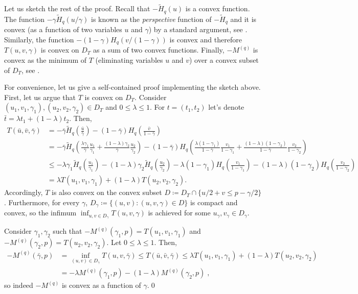 \documentclass{article}
\newcommand{\Htilde}{\tilde{H}}
\theoremstyle{plain}
\theoremstyle{plain}
\theoremstyle{plain}
\theoremstyle{plain}
\theoremstyle{plain}
\theoremstyle{plain}
\theoremstyle{plain}
\theoremstyle{plain}
\theoremstyle{plain}
\theoremstyle{plain}
\theoremstyle{remark}
\theoremstyle{remark}
\theoremstyle{remark}
\theoremstyle{plain}
\begin{document}
Let us sketch the rest of the proof.
Recall that $-\Htilde_q(u)$ is a convex function.
The function $-\gamma\Htilde_q(u/\gamma)$ is known as the \emph{perspective}
function of $-\Htilde_q$ and it is convex (as a function
of two variables $u$ and $\gamma$) by a standard argument, see \cite[Section 3.2.6]{boyd2004convex}.
Similarly, the function $-(1-\gamma)H_q(v/(1-\gamma))$ is
convex and therefore $T(u,v,\gamma)$ is convex on $D_T$
as a sum of two convex functions.
Finally, $-M^{(q)}$ is convex as the minimum of $T$
(eliminating variables $u$ and $v$)
over a convex subset of $D_T$, see \cite[Section 3.2.5]{boyd2004convex}.

For convenience, let us give a self-contained proof
implementing the sketch above. First, let us argue that $T$
is convex on $D_T$.
Consider $(u_1,v_1,\gamma_1),(u_2,v_2,\gamma_2)\in D_T$
and $0\le\lambda\le 1$.
For $t=(t_1,t_2)$ let's denote $\bar{t}=\lambda t_1+(1-\lambda)t_2$. 
Then,
\begin{align*}
T\left(\bar{u},\bar{v},\bar{\gamma}\right)&=-\bar{\gamma}
\Htilde_q\left(\frac{\bar{u}}{\bar{\gamma}}\right)
-(1-\bar{\gamma})H_q\left(\frac{\bar{v}}{1-\bar{\gamma}}\right)
        \\&=-\bar{\gamma}\Htilde_q\left(\frac{\lambda\gamma_1}{\bar{\gamma}}\frac{u_1}{\gamma_1}+\frac{(1-\lambda)\gamma_2}{\bar{\gamma}}\frac{u_2}{\gamma_2}\right)-(1-\bar{\gamma})H_q\left(\frac{\lambda(1-\gamma_1)}{1-\bar{\gamma}}\frac{v_1}{1-\gamma_1}+\frac{(1-\lambda)(1-\gamma_2)}{1-\bar{\gamma}}\frac{v_2}{1-\gamma_2}\right)
        \\&\le-\lambda\gamma_1\Htilde_q\left(\frac{u_1}{\gamma_1}\right)-(1-\lambda)\gamma_2
\Htilde_q\left(\frac{u_2}{\gamma_2}\right)- \lambda(1-\gamma_1)H_q\left(\frac{v_1}{1-\gamma_1}\right)-(1-\lambda)(1-\gamma_2)H_q\left(\frac{v_2}{1-\gamma_2}\right)
\\&=\lambda T(u_1,v_1,\gamma_1)+ (1-\lambda)T(u_2,v_2,\gamma_2).
\end{align*}
Accordingly, $T$ is also convex on the convex subset
$D\coloneqq D_T\cap\{u/2+v\le p-\gamma/2\}$.
Furthermore, for every $\gamma$,
$D_\gamma\coloneqq\{(u,v):(u,v,\gamma)\in D\}$
is compact and convex,
so the infimum $
\inf_{u,v\in D_\gamma}T(u,v,\gamma)$
is achieved for some $u_\gamma,v_\gamma\in D_\gamma$.

Consider $\gamma_1,\gamma_2$ such that
$-M^{(q)}(\gamma_1,p)=T(u_1,v_1,\gamma_1)$
and $-M^{(q)}(\gamma_2,p)=T(u_2,v_2,\gamma_2)$.
Let $0\le\lambda\le 1$. Then,
 \begin{align*}
     -M^{(q)}(\bar{\gamma},p)&=\inf_{(u,v)\in D_{\bar{\gamma}}}
     T(u,v,\bar{\gamma})
     \le T(\bar{u},\bar{v},\bar{\gamma})
     \le \lambda T(u_1,v_1,\gamma_1)+(1-\lambda)T(u_2,v_2,\gamma_2)
     \\&=-\lambda M^{(q)}(\gamma_1,p)-(1-\lambda)M^{(q)}(\gamma_2,p)\;,
 \end{align*}
so indeed $-M^{(q)}$ is convex as a function of $\gamma$.\qed
\end{document}
